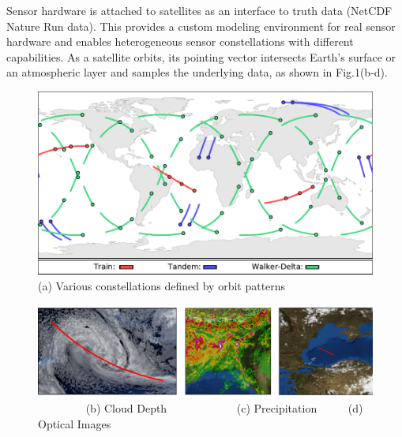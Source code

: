 \documentclass[conference]{IEEEtran}
\begin{document}
Sensor hardware is attached to satellites as an interface to truth data (NetCDF Nature Run data).  This provides a custom modeling environment for real sensor hardware and enables heterogeneous sensor constellations with different capabilities.  As a satellite orbits, its pointing vector intersects Earth's surface or an atmospheric layer and samples the underlying data, as shown in Fig.1(b-d).

\begin{figure}[t]
  \begin{minipage}[b]{\linewidth}
    \begin{center}
      \includegraphics[width=\textwidth]{images/constellations.pdf}
      {\footnotesize(a) Various constellations defined by orbit patterns}
    \end{center}
    \medskip
  \end{minipage}
  \begin{minipage}[b]{\linewidth}
    \begin{center}
      \includegraphics[width=\textwidth]{images/remote_sensing.pdf}
      {\footnotesize{
          \color{white}~~~~~~~~\color{black}
          (b) Cloud Depth~~~~~~~~~~~~
          (c) Precipitation~~~~~
          (d) Optical Images}}
    \end{center}
    \medskip
  \end{minipage}
  \begin{minipage}[b]{\linewidth}
    \begin{center}

\end{center}
\end{minipage}
\end{figure}
\end{document}
